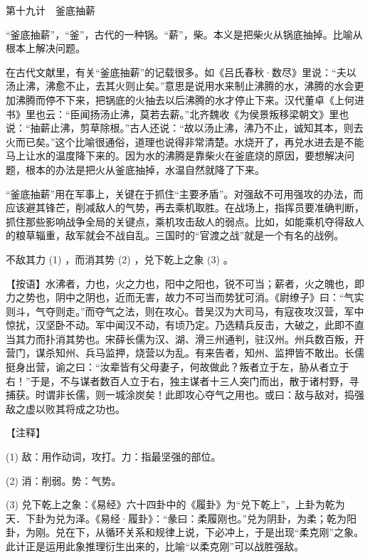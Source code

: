 \documentclass[12pt,UTF8]{ctexbook}
\begin{document}
第十九计　釜底抽薪


“釜底抽薪”，“釜”，古代的一种锅。“薪”，柴。本义是把柴火从锅底抽掉。比喻从根本上解决问题。

在古代文献里，有关“釜底抽薪”的记载很多。如《吕氏春秋·数尽》里说：“夫以汤止沸，沸愈不止，去其火则止矣。”意思是说用水来制止沸腾的水，沸腾的水会更加沸腾而停不下来，把锅底的火抽去以后沸腾的水才停止下来。汉代董卓《上何进书》里也云：“臣闻扬汤止沸，莫若去薪。”北齐魏收《为侯景叛移梁朝文》里也说：“抽薪止沸，剪草除根。”古人还说：“故以汤止沸，沸乃不止，诚知其本，则去火而已矣。”这个比喻很通俗，道理也说得非常清楚。水烧开了，再兑水进去是不能马上让水的温度降下来的。因为水的沸腾是靠柴火在釜底烧的原因，要想解决问题，根本的办法是把火从釜底抽掉，水温自然就降了下来。

“釜底抽薪”用在军事上，关键在于抓住“主要矛盾”。对强敌不可用强攻的办法，而应该避其锋芒，削减敌人的气势，再去乘机取胜。在战场上，指挥员要准确判断，抓住那些影响战争全局的关键点，乘机攻击敌人的弱点。比如，如能乘机夺得敌人的粮草辎重，敌军就会不战自乱。三国时的“官渡之战”就是一个有名的战例。





不敌其力 (1) ，而消其势 (2) ，兑下乾上之象 (3) 。

【按语】水沸者，力也，火之力也，阳中之阳也，锐不可当；薪者，火之魄也，即力之势也，阴中之阴也，近而无害，故力不可当而势犹可消。《尉缭子》曰：“气实则斗，气夺则走。”而夺气之法，则在攻心。昔吴汉为大司马，有寇夜攻汉营，军中惊扰，汉坚卧不动。军中闻汉不动，有顷乃定。乃选精兵反击，大破之，此即不直当其力而扑消其势也。宋薛长儒为汉、湖、滑三州通判，驻汉州。州兵数百叛，开营门，谋杀知州、兵马监押，烧营以为乱。有来告者，知州、监押皆不敢出。长儒挺身出营，谕之曰：“汝辈皆有父母妻子，何故做此？叛者立于左，胁从者立于右！”于是，不与谋者数百人立于右，独主谋者十三人突门而出，散于诸村野，寻捕获。时谓非长儒，则一城涂炭矣！此即攻心夺气之用也。或曰：敌与敌对，捣强敌之虚以败其将成之功也。





【注释】


(1) 敌：用作动词，攻打。力：指最坚强的部位。

(2) 消：削弱。势：气势。

(3) 兑下乾上之象：《易经》六十四卦中的《履卦》为“兑下乾上”，上卦为乾为天．下卦为兑为泽。《易经·履卦》：“彖曰：柔履刚也。”兑为阴卦，为柔；乾为阳卦，为刚。兑在下，从循环关系和规律上说，下必冲上，于是出现“柔克刚”之象。此计正是运用此象推理衍生出来的，比喻“以柔克刚”可以战胜强敌。
\end{document}
